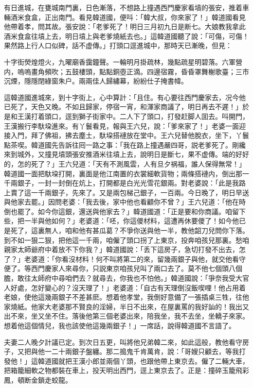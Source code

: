 有日進城，在甕城南門裏，日色漸落，不想路上撞遇西門慶家看墳的張安，推着車輛酒米食盒，正出南門。看見韓道國，便呌：「韓大叔，你來家了！」韓道國看見他帶着孝，問其故。張安說：「老爹死了！明日三月初九日是断七。大娘教我拿此酒米食盒往墳上去，明日墳上與老爹燒紙去也。」這韓道國聽了說：「可傷，可傷！果然路上行人口似碑，話不虚傳。」打頭口逕進城中，那時天已漸晚，但見：

十字街熒煌燈火，九曜廟香靄鐘聲。一輪明月掛疏林，幾點疏星明碧落。六軍營内，嗚嗚畫角頻吹；五鼓樓頭，點點銅壺正滴。四邊宿霧，昏昏罩舞榭歌臺；三市沉煙，隱隱閉綠窗朱户。兩兩佳人歸繡幕，紛紛仕子掩書幃。　

這韓道國進城來，到十字街上，心中算計：「且住。有心要往西門慶家去，况今他已死了，天色又晚。不如且歸家，停宿一宵，和渾家商議了，明日再去不遲！」於是和王漢打着頭口，逕到獅子街家中。二人下了頭口，打發赶脚人囬去。呌開門，王漢搬行李馱垜進來。有丫鬟看見，報與王六兒，說：「爹來家了！」老婆一面迎接入門，拜了佛祖，拂去塵土，馱垜搭褳放在堂中。王六兒替他脫衣，坐下，丫鬟點茶喫。韓道國先告訴往囘一路之事：「我在路上撞遇嚴四哥，説老爹死了。剛纔來到城外，又撞見墳頭張安推酒米往墳上去，說明日是斷七，果不虚傳。端的好好的，怎的死了？」王六兒道：「天有不測風雲，人有旦夕祸福，誰人保得無常！」韓道國一面把馱垜打開，裏面是他江南置的衣裳細軟貨物；兩條搭褳内，倒出那一千兩銀子，一封一封倒在炕上，打開都是白光光雪花銀兩。對老婆說：「此是我路上賣了這一千兩銀子，先來了。又是兩包梯己銀子，一百兩。今日晚了，明日早送與他家去罷。」因問老婆：「我去後，家中他也看顧你不曾？」王六兒道：「他在時倒也罷了。如今你這銀，還送與他家去？」韓道國道：「正是要和你商議。咱留下些，把一半與他如何？」老婆道：「呸，你這儍材料，這遭再休要儍了！如今他已是死了，這裏無人，咱和他有甚瓜葛？不爭你送與他一半，教他韶刀兒問你下落。到不如一狠二狠，把他這一千兩，咱僱了頭口拐了上東京，投奔咱孩兒那裏。愁咱親家太師爺府中着放不下你我？」韓道國說：「丢下這房子，急切打發不出去，怎了？」老婆道：「你看沒材料！何不叫將第二的來，留幾兩銀子與他，就交他看守便了。等西門慶家人來尋你，只説東京咱孩兒叫了兩口去了。莫不他七個頭八個膽，敢往太師府中尋咱們去？就尋去，你我也不怕他。」韓道國說：「爭奈我受大官人好處，怎好變心的？沒天理了！」老婆道：「自古有天理倒沒飯喫哩！他占用着老娘，使他這幾兩銀子不差甚麽。想着他孝堂，我倒好意備了一張插桌三牲，往他家燒紙。他家大老婆那不賢良的淫婦，半日不出來，在屋裏罵的我好訕的！我出又出不來，坐又坐不住。落後他第三個老婆出來，陪我坐，我不去坐，坐轎子來家。想着他這個情兒，我也該使他這幾兩銀子！」一席話，說得韓道國不言語了。

夫妻二人晚夕計議已定。到次日五更，叫將他兄弟韓二來，如此這般，教他看守房子，又把與他一二十兩銀子盤纏。那二搗鬼千肯萬肯，說：「哥嫂只顧去，等我打發他！」這韓道國就把王漢小郎並兩個丫頭，也跟他帶上東京去。僱了二輛大車，把箱籠細軟之物都裝在車上，投天明出西門，逕上東京去了。正是：撞碎玉籠飛彩鳳，頓断金鎖走蛟龍。

